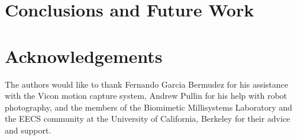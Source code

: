 \documentclass[letterpaper, 10 pt, conference]{ieeeconf}
\begin{document}
\addtolength{\textheight}{-0cm}


\section{Conclusions and Future Work}

\section{Acknowledgements}
The authors would like to thank Fernando Garcia Bermudez for his assistance with the Vicon motion capture system, Andrew Pullin for his help with robot photography, and the members of the Biomimetic Millisystems Laboratory and the EECS community at the University of California, Berkeley for their advice and support.


\end{document}
